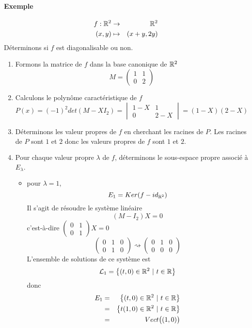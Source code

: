\paragraph{Exemple}
\begin{eqnarray*}
  f: \mathbb{R}^2 &\rightarrow& \mathbb{R}^2 \\
  (x, y) &\mapsto& (x + y, 2y)
\end{eqnarray*}
Déterminons si $f$ est diagonalisable ou non.
\begin{enumerate}[(1)]
  \item Formons la matrice de $f$ dans la base canonique de $\mathbb{R}^2$
    $$M = \begin{pmatrix} 1 & 1 \\ 0 & 2 \end{pmatrix}$$
  
  \item Calculons le polynôme caractéristique de $f$
    $$P(x) = (-1)^2 det(M - X I_2) = \begin{vmatrix} 1-X & 1 \\ 0 & 2-X \end{vmatrix} = (1-X)(2-X)$$
    
  \item Déterminons les valeur propres de $f$ en cherchant les racines de $P$. Les racines de $P$ sont $1$ et $2$ donc les valeurs propres de $f$ sont $1$ et $2$.
  
  \item Pour chaque valeur propre $\lambda$ de $f$, déterminons le sous-espace propre associé à $E_\lambda$.
    \begin{itemize}
      \item pour $\lambda = 1$, 
        $$E_1 = Ker(f - id_{\mathbb{R}^2})$$
        Il s'agit de résoudre le système linéaire
        $$(M - I_2) X = 0$$
        c'est-à-dire $\begin{pmatrix} 0 & 1 \\ 0 & 1 \end{pmatrix} X = 0$
        $$\left( \begin{array}{cc|c} 0 & 1 & 0 \\ 0 & 1 & 0 \end{array} \right) \rightsquigarrow
          \left( \begin{array}{cc|c} 0 & 1 & 0 \\ 0 & 0 & 0 \end{array} \right) $$
        L'ensemble de solutions de ce système est
        $$\mathcal{L}_1 = \left\{(t, 0) \in \mathbb{R}^2 ~ \vert ~ t \in \mathbb{R} \right\}$$
        donc 
        \begin{eqnarray*}
          E_1 &=& \left\{(t, 0) \in \mathbb{R}^2 ~ \vert ~ t \in \mathbb{R} \right\} \\
            &=& \left\{t(1, 0) \in \mathbb{R}^2 ~ \vert ~ t \in \mathbb{R} \right\} \\
            &=& Vect\big((1, 0)\big)
        \end{eqnarray*}
        

\end{itemize}
\end{enumerate}
